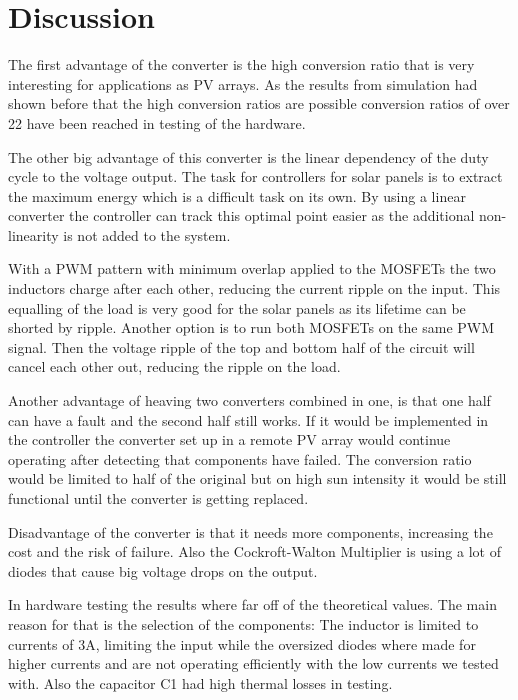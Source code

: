 \chapter{Discussion}\label{ch:Discussion}


The first advantage of the converter is the high conversion ratio that is very interesting for applications as PV arrays. As the results from simulation had shown before that the high conversion ratios are possible conversion ratios of over 22 have been reached in testing of the hardware.


The other big advantage of this converter is the linear dependency of the duty cycle to the voltage output. The task for controllers for solar panels is to extract the maximum energy which is a difficult task on its own. 
By using a linear converter the controller can track this optimal point easier as the additional non-linearity is not added to the system.


With a PWM pattern with minimum overlap applied to the MOSFETs the two inductors charge after each other, reducing the current ripple on the input. This equalling of the load is very good for the solar panels as its lifetime can be shorted by ripple. %
Another option is to run both MOSFETs on the same PWM signal.
Then the voltage ripple of the top and bottom half of the circuit will cancel each other out, reducing the ripple on the load. 

Another advantage of heaving two converters combined in one, is that one half can have a fault and the second half still works.
If it would be implemented in the controller the converter set up in a remote PV array would continue operating after detecting that components have failed. 
The conversion ratio would be limited to half of the original but on high sun intensity it would be still functional until the converter is getting replaced.


Disadvantage of the converter is that it needs more components, increasing the cost and the risk of failure.
Also the Cockroft-Walton Multiplier is using a lot of diodes that cause big voltage drops on the output.

In hardware testing the results where far off of the theoretical values.
The main reason for that is the selection of the components: 
The inductor is limited to currents of 3A, limiting the input while the oversized diodes where made for higher currents and are not operating efficiently with the low currents we tested with.
Also the capacitor C1 had high thermal losses in testing.

